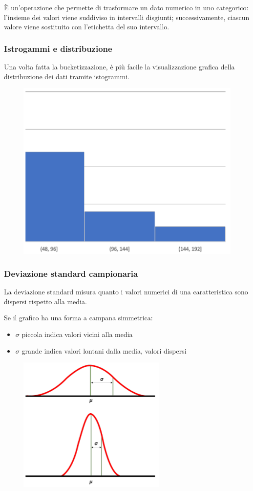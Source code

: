 \documentclass{report}
\begin{document}
È un'operazione che permette di trasformare un dato numerico in uno categorico: l'insieme dei valori viene suddiviso in intervalli disgiunti; 
successivamente, ciascun valore viene sostituito con l'etichetta del suo intervallo.

\subsubsection{Istrogammi e distribuzione}
Una volta fatta la bucketizzazione, è più facile la visualizzazione grafica della distribuzione dei dati tramite istogrammi.

\begin{figure}[H]
    \centering
    \includegraphics[width=0.5\linewidth]{images/isto.png}
\end{figure}

\subsubsection{Deviazione standard campionaria}
La deviazione standard misura quanto i valori numerici di una caratteristica sono dispersi rispetto alla media.

\noindent Se il grafico ha una forma a campana simmetrica:
\begin{itemize}
    \item $\sigma$ piccola indica valori vicini alla media 
    \item $\sigma$ grande indica valori lontani dalla media, valori dispersi 
\end{itemize}

\begin{figure}[H]
    \centering
    \includegraphics[width=0.5\linewidth]{images/deviazione-standard.png}
\end{figure}
\end{document}

